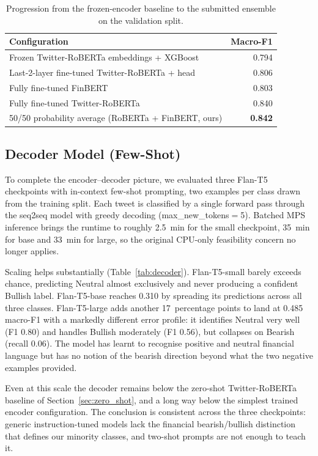 \documentclass[12pt,a4paper]{article}
\begin{document}
\begin{table}[!htbp]
\centering
\begin{tabular}{lr}
\toprule
\textbf{Configuration} & \textbf{Macro-F1} \\
\midrule
Frozen Twitter-RoBERTa embeddings + XGBoost                 & 0.794 \\
Last-2-layer fine-tuned Twitter-RoBERTa + head              & 0.806 \\
Fully fine-tuned FinBERT                                    & 0.803 \\
Fully fine-tuned Twitter-RoBERTa                            & 0.840 \\
50/50 probability average (RoBERTa + FinBERT, ours)         & \textbf{0.842} \\
\bottomrule
\end{tabular}
\caption{Progression from the frozen-encoder baseline to the submitted ensemble on the validation split.}
\label{tab:finetune}
\end{table}

\subsection{Decoder Model (Few-Shot)}
\label{sec:decoder}

To complete the encoder--decoder picture, we evaluated three Flan-T5 checkpoints with in-context few-shot prompting, two examples per class drawn from the training split. Each tweet is classified by a single forward pass through the seq2seq model with greedy decoding (max\_new\_tokens$=$5). Batched MPS inference brings the runtime to roughly 2.5~min for the small checkpoint, 35~min for base and 33~min for large, so the original CPU-only feasibility concern no longer applies.

Scaling helps substantially (Table~\ref{tab:decoder}). Flan-T5-small barely exceeds chance, predicting Neutral almost exclusively and never producing a confident Bullish label. Flan-T5-base reaches 0.310 by spreading its predictions across all three classes. Flan-T5-large adds another 17~percentage points to land at 0.485 macro-F1 with a markedly different error profile: it identifies Neutral very well (F1 0.80) and handles Bullish moderately (F1 0.56), but collapses on Bearish (recall 0.06). The model has learnt to recognise positive and neutral financial language but has no notion of the bearish direction beyond what the two negative examples provided.

Even at this scale the decoder remains below the zero-shot Twitter-RoBERTa baseline of Section~\ref{sec:zero_shot}, and a long way below the simplest trained encoder configuration. The conclusion is consistent across the three checkpoints: generic instruction-tuned models lack the financial bearish/bullish distinction that defines our minority classes, and two-shot prompts are not enough to teach it.
\end{document}

